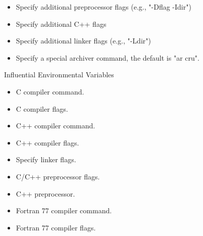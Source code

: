 \begin{itemize}
\item {}

Specify additional preprocessor flags (e.g., "-Dflag -Idir")

\item {}

Specify additional C++ flags

\item {}

Specify additional linker flags (e.g., "-Ldir")

\item {}

Specify a special archiver command, the default is "ar cru".
\end{itemize}

 Influential Environmental Variables

\begin{itemize}
\item {}

C compiler command.

\item {}

C compiler flags.

\item {}

C++ compiler command.

\item {}

C++ compiler flags.

\item {}

Specify linker flags.

\item {}

C/C++ preprocessor flags.

\item {}

C++ preprocessor.

\item {}

Fortran 77 compiler command.

\item {}

Fortran 77 compiler flags.
\end{itemize}

